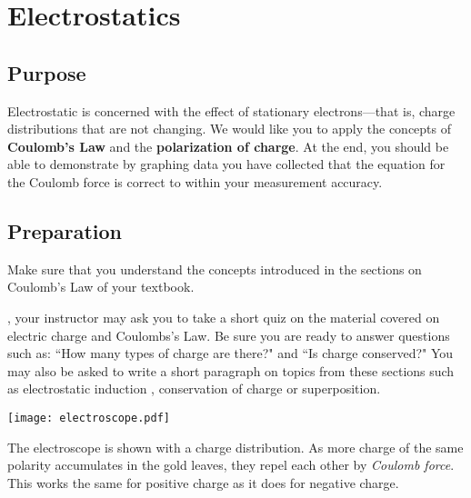 
\chapter{Electrostatics}

\section{Purpose}
Electrostatic is concerned with the effect of stationary electrons---that is, charge distributions that are not changing.  We would like you to apply the concepts of \textbf{Coulomb's Law}%
	and the \textbf{polarization of charge}.  At the end, you should be able to demonstrate by graphing data you have collected that the equation for the Coulomb force is correct to within your measurement accuracy.	
		
\section{Preparation}
Make sure that you understand the concepts introduced in the sections on Coulomb's Law of your textbook.  %

, your instructor may ask you to take a short quiz on the material covered on electric charge and Coulombs's Law. %
Be sure you are ready to answer questions such as: ``How many types of charge are there?" and ``Is charge conserved?"  You may also be asked to write a short paragraph on topics from these sections such as electrostatic induction
, conservation of charge
or superposition.
\begin{marginfigure}%
	\texttt{[image: electroscope.pdf]}
	\caption{The electroscope is shown with a charge distribution.  As more charge of the same polarity accumulates in the gold leaves, they repel each other by \textit{Coulomb force}.  This works the same for positive charge as it does for negative charge.}
\end{marginfigure}
